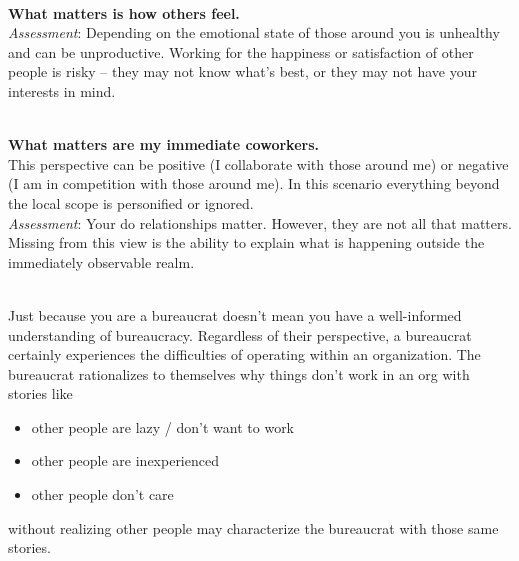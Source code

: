 \ \\ 
\textbf{What matters is how others feel.}\\
\textit{Assessment}: Depending on the emotional state of those around you is unhealthy and can be unproductive. Working for the happiness or satisfaction of other people is risky -- they may not know what's best, or they may not have your interests in mind.

\ \\
\textbf{What matters are my immediate coworkers.}\\
This perspective can be positive (I collaborate with those around me) or negative (I am in competition with those around me).
In this scenario everything beyond the local scope is personified or ignored.  \\
\textit{Assessment}: Your do relationships matter. However, they are not all that matters. Missing from this view is the ability to explain what is happening outside the immediately observable realm. 

\ \\

Just because you are a bureaucrat doesn't mean you have a well-informed understanding of bureaucracy. Regardless of their perspective, a bureaucrat certainly experiences the difficulties of operating within an organization. The bureaucrat rationalizes to themselves why things don't work in an org with stories like
\begin{itemize}
\item other people are lazy / don't want to work
\item other people are inexperienced
\item other people don't care
\end{itemize}
without realizing other people may characterize the bureaucrat with those same stories. 